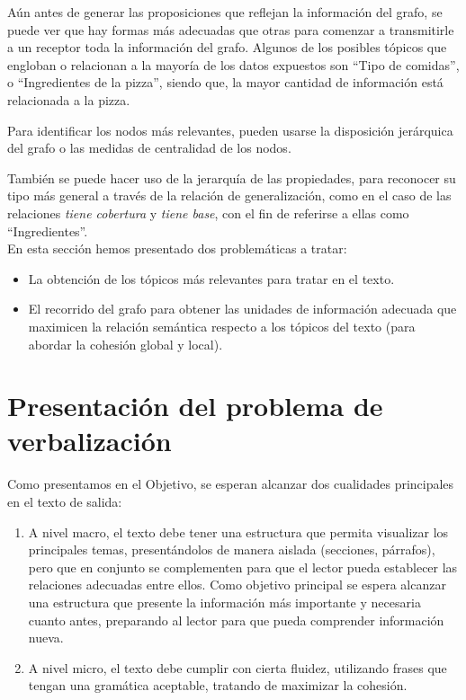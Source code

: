Aún antes de generar las proposiciones que reflejan la información del grafo, se puede ver que hay formas más adecuadas que otras para comenzar a transmitirle a un receptor toda la información del grafo. Algunos de los posibles tópicos que engloban o relacionan a la mayoría de los datos expuestos son ``Tipo de comidas'', o ``Ingredientes de la pizza'', siendo que, la mayor cantidad de información está relacionada a la pizza. 

Para identificar los nodos más relevantes, pueden usarse la disposición jerárquica del grafo o las medidas de centralidad de los nodos.

También se puede hacer uso de la jerarquía de las propiedades, para reconocer su tipo más general a través de la relación de generalización, como en el caso de las relaciones \emph{tiene cobertura} y \emph{tiene base}, con el fin de referirse a ellas como ``Ingredientes''.
\\

En esta sección hemos presentado dos problemáticas a tratar:

\begin{itemize}
    \item La obtención de los tópicos más relevantes para tratar en el texto.%
    \item El recorrido del grafo para obtener las unidades de información adecuada que maximicen la relación semántica respecto a los tópicos del texto (para abordar la cohesión global y local).%
\end{itemize}

 
\section{Presentación del problema de verbalización}
Como presentamos en el Objetivo, se esperan alcanzar dos cualidades principales en el texto de salida:
\begin{enumerate}
    \item A nivel macro, el texto debe tener una estructura que permita visualizar los principales temas, presentándolos de manera aislada (secciones, párrafos), pero que en conjunto se complementen para que el lector pueda establecer las relaciones adecuadas entre ellos. Como objetivo principal se espera alcanzar una estructura que presente la información más importante y necesaria cuanto antes, preparando al lector para que pueda comprender información nueva.
    \item A nivel micro, el texto debe cumplir con cierta fluidez, utilizando frases que tengan una gramática aceptable, tratando de maximizar la cohesión.
\end{enumerate}{}